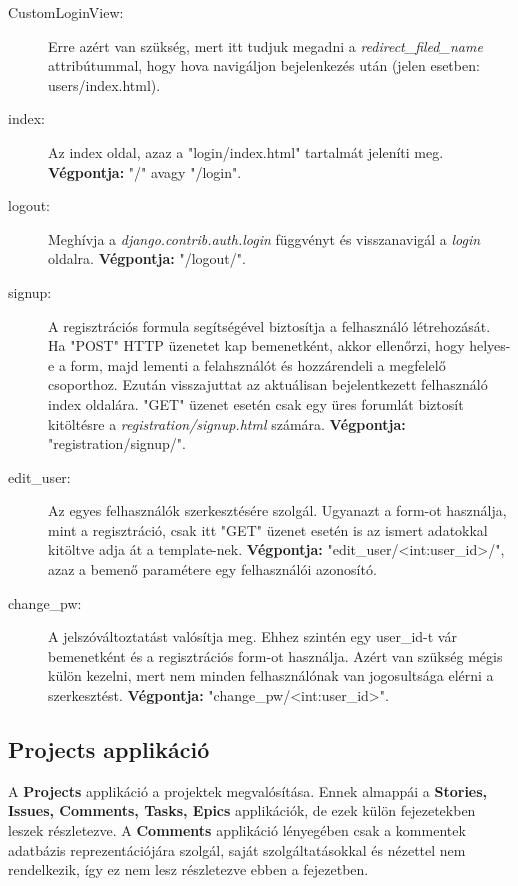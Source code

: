 \begin{itemize}
	\begin{description}
		\item[CustomLoginView:] Erre azért van szükség, mert itt tudjuk megadni a \textit{redirect\_filed\_name} attribútummal, hogy hova navigáljon bejelenkezés után (jelen esetben: users/index.html).
		\item[index:] Az index oldal, azaz a "login/index.html" tartalmát jeleníti meg. 
\textbf{Végpontja:} "/" avagy "/login".
		\item[logout:] Meghívja a  \textit{django.contrib.auth.login} függvényt és visszanavigál a \textit{login} oldalra. 
\textbf{Végpontja:} "/logout/".
		\item[signup:] A regisztrációs formula segítségével biztosítja a felhasználó létrehozását. Ha "POST" HTTP üzenetet kap bemenetként, akkor ellenőrzi, hogy helyes-e a form, majd lementi a felahsználót és hozzárendeli a megfelelő csoporthoz. Ezután visszajuttat az aktuálisan bejelentkezett felhasználó index oldalára. "GET" üzenet esetén csak egy üres forumlát biztosít kitöltésre a \textit{registration/signup.html} számára. 
\textbf{Végpontja:} "registration/signup/".
		\item[edit\_user:] Az egyes felhasználók szerkesztésére szolgál. Ugyanazt a form-ot használja, mint a regisztráció, csak itt "GET" üzenet esetén is az ismert adatokkal kitöltve adja át a template-nek. 
\textbf{Végpontja:} "edit\_user/<int:user\_id>/", azaz a bemenő paramétere egy felhasználói azonosító.
		\item[change\_pw:] A jelszóváltoztatást valósítja meg. Ehhez szintén egy user\_id-t vár bemenetként és a regisztrációs form-ot használja. Azért van szükség mégis külön kezelni, mert nem minden felhasználónak van jogosultsága elérni a szerkesztést. 
\textbf{Végpontja:} "change\_pw/<int:user\_id>".
	\end{description}
\end{itemize}

\subsection{Projects applikáció}

A \textbf{Projects} applikáció a projektek megvalósítása. Ennek almappái a \textbf{Stories, Issues, Comments, Tasks, Epics} applikációk, de ezek külön fejezetekben leszek részletezve. A \textbf{Comments} applikáció lényegében csak a kommentek adatbázis reprezentációjára szolgál, saját szolgáltatásokkal és nézettel nem rendelkezik, így ez nem lesz részletezve ebben a fejezetben.

